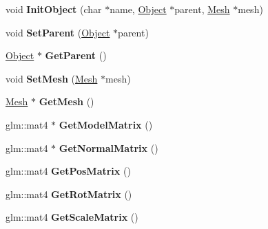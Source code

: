 \begin{DoxyCompactItemize}
\item 
\hypertarget{class_object_ab37a94ec1146c22546445d4baaf55697}{}void {\bfseries Init\+Object} (char $\ast$name, \hyperlink{class_object}{Object} $\ast$parent, \hyperlink{class_mesh}{Mesh} $\ast$mesh)\label{class_object_ab37a94ec1146c22546445d4baaf55697}

\item 
\hypertarget{class_object_a344ba3716db86c373345265935280968}{}void {\bfseries Set\+Parent} (\hyperlink{class_object}{Object} $\ast$parent)\label{class_object_a344ba3716db86c373345265935280968}

\item 
\hypertarget{class_object_a6f86d9e3b77d79cc3a6a4d57a5c9ed72}{}\hyperlink{class_object}{Object} $\ast$ {\bfseries Get\+Parent} ()\label{class_object_a6f86d9e3b77d79cc3a6a4d57a5c9ed72}

\item 
\hypertarget{class_object_a6be7369b2a3382f82ea8d3e61c061b59}{}void {\bfseries Set\+Mesh} (\hyperlink{class_mesh}{Mesh} $\ast$mesh)\label{class_object_a6be7369b2a3382f82ea8d3e61c061b59}

\item 
\hypertarget{class_object_ac59efbef5ea2a39576d7a057eb5e11ac}{}\hyperlink{class_mesh}{Mesh} $\ast$ {\bfseries Get\+Mesh} ()\label{class_object_ac59efbef5ea2a39576d7a057eb5e11ac}

\item 
\hypertarget{class_object_a58e26d2cc568b514884336ed279dc00c}{}glm\+::mat4 $\ast$ {\bfseries Get\+Model\+Matrix} ()\label{class_object_a58e26d2cc568b514884336ed279dc00c}

\item 
\hypertarget{class_object_ae7ebb71e79aeb36213dd3e053a72b446}{}glm\+::mat4 $\ast$ {\bfseries Get\+Normal\+Matrix} ()\label{class_object_ae7ebb71e79aeb36213dd3e053a72b446}

\item 
\hypertarget{class_object_aa26a8254ffe085f5f68c37f5b7f19f23}{}glm\+::mat4 {\bfseries Get\+Pos\+Matrix} ()\label{class_object_aa26a8254ffe085f5f68c37f5b7f19f23}

\item 
\hypertarget{class_object_a806ea3c855a382f8f6986760505ac808}{}glm\+::mat4 {\bfseries Get\+Rot\+Matrix} ()\label{class_object_a806ea3c855a382f8f6986760505ac808}

\item 
\hypertarget{class_object_ac35d079dfc5a9fbab69fe6ab5d5e2696}{}glm\+::mat4 {\bfseries Get\+Scale\+Matrix} ()\label{class_object_ac35d079dfc5a9fbab69fe6ab5d5e2696}


\end{DoxyCompactItemize}
